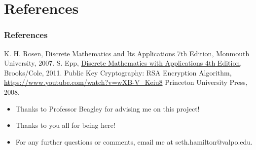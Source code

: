 \documentclass{beamer}
\begin{document}
\section{References}
\begin{frame}
\frametitle{References}
\begin{thebibliography}{99}

 K. H. Rosen, \underline{Discrete Mathematics and Its Applications 7th Edition}, Monmouth University, 2007.
 S. Epp, \underline{Discrete Mathematics with Applications 4th Edition}, Brooks/Cole, 2011.
 Public Key Cryptography: RSA Encryption Algorithm, \\ \url{https://www.youtube.com/watch?v=wXB-V_Keiu8}
Princeton University Press, 2008.

\end{thebibliography}

\end{frame}
\begin{frame}
\begin{center}
\begin{itemize}
\item Thanks to Professor Beagley for advising me on this project!
\item Thanks to you all for being here!
\item For any further questions or comments, email me at seth.hamilton@valpo.edu.
\end{itemize}
\end{center}
\end{frame}
\end{document}
